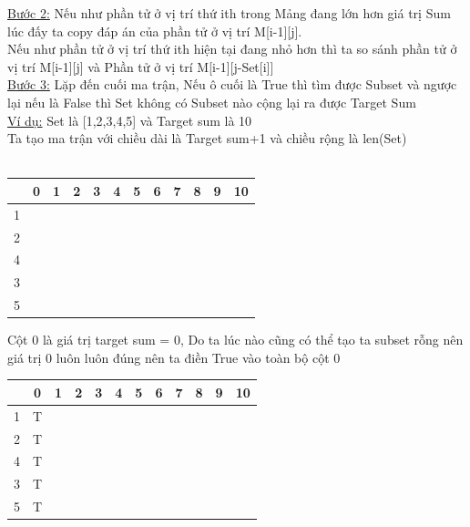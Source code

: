 \documentclass{article}
\begin{document}
    \underline{Bước 2:} Nếu như phần tử ở vị trí thứ ith  trong Mảng  đang lớn hơn giá trị Sum lúc đấy ta copy đáp án của phần tử ở vị trí  M[i-1][j]. \\
    \hspace*{1.8cm}Nếu như phần tử ở vị trí thứ ith hiện tại đang nhỏ hơn thì ta so sánh phần tử ở vị trí M[i-1][j] và Phần tử ở vị trí M[i-1][j-Set[i]]\\
    
    \underline{Bước 3:} Lặp đến cuối ma trận, Nếu ô cuối là True thì tìm được Subset và ngược lại nếu là False thì Set không có Subset nào cộng lại ra được Target Sum\\
    
    \underline{Ví dụ:} Set là [1,2,3,4,5] và Target sum là 10\\
    
    Ta tạo ma trận với chiều dài là Target sum+1 và chiều rộng là len(Set)\\\\
    \begin{center}
        \begin{tabular}{|c|c|c|c|c|c|c|c|c|c|c|c|}
        \hline
        {}&{0}&{1}&{2}&{3}&{4}&{5}&{6}&{7}&{8}&{9}&{10}\\
        \hline
        1&&&&&&&&&&&\\
        \hline
        2&&&&&&&&&&&\\
        \hline
        4&&&&&&&&&&&\\
        \hline
        3&&&&&&&&&&&\\
        \hline
        5&&&&&&&&&&&\\
        \hline
         
    \end{tabular}
    \end{center}
    
    
    Cột 0 là giá trị target sum = 0, Do ta lúc nào cũng có thể tạo ta subset rỗng nên giá trị 0 luôn luôn đúng nên ta điền True vào toàn bộ cột 0\\
    \begin{center}
        \begin{tabular}{|c|c|c|c|c|c|c|c|c|c|c|c|}
        \hline
        {}&{0}&{1}&{2}&{3}&{4}&{5}&{6}&{7}&{8}&{9}&{10}\\
        \hline
        1&T&&&&&&&&&&\\
        \hline
        2&T&&&&&&&&&&\\
        \hline
        4&T&&&&&&&&&&\\
        \hline
        3&T&&&&&&&&&&\\
        \hline
        5&T&&&&&&&&&&\\
        \hline
    \end{tabular}
    \end{center}
    
\end{document}
